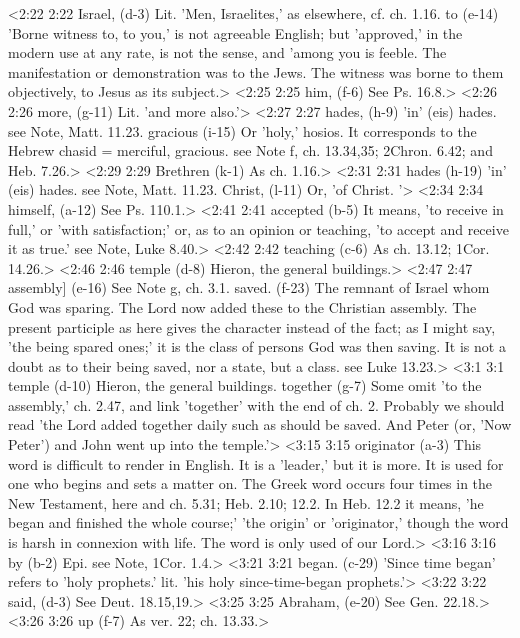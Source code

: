 <2:22 2:22  Israel, (d-3)  Lit. 'Men, Israelites,' as elsewhere, cf. ch. 1.16.
  to (e-14)  'Borne witness to, to you,' is not agreeable English; but  'approved,' in the modern use at any rate, is not the sense,  and 'among you is feeble. The manifestation or demonstration  was to the Jews. The witness was borne to them objectively, to  Jesus as its subject.>
<2:25 2:25  him, (f-6)  See Ps. 16.8.>
<2:26 2:26  more, (g-11)  Lit. 'and more also.'>
<2:27 2:27  hades, (h-9) 'in' (eis) hades. see Note, Matt. 11.23.
  gracious (i-15)  Or 'holy,' hosios. It corresponds to the Hebrew chasid =  merciful, gracious. see Note f, ch. 13.34,35; 2Chron. 6.42; and  Heb. 7.26.>
<2:29 2:29 Brethren (k-1)  As ch. 1.16.>
<2:31 2:31  hades (h-19)  'in' (eis) hades. see Note, Matt. 11.23.
  Christ, (l-11)  Or, 'of Christ. '>
<2:34 2:34  himself, (a-12)  See Ps. 110.1.>
<2:41 2:41  accepted (b-5)  It means, 'to receive in full,' or 'with satisfaction;' or,  as to an opinion or teaching, 'to accept and receive it as  true.' see Note, Luke 8.40.>
<2:42 2:42  teaching (c-6)  As ch. 13.12; 1Cor. 14.26.>
<2:46 2:46  temple (d-8)  Hieron, the general buildings.>
<2:47 2:47  assembly] (e-16)  See Note g, ch. 3.1.
  saved. (f-23)  The remnant of Israel whom God was sparing. The Lord now  added these to the Christian assembly. The present participle  as here gives the character instead of the fact; as I might  say, 'the being spared ones;' it is the class of persons God  was then saving. It is not a doubt as to their being saved, nor  a state, but a class. see Luke 13.23.>
<3:1 3:1  temple (d-10)  Hieron, the general buildings.
  together (g-7)  Some omit 'to the assembly,' ch. 2.47, and link 'together'  with the end of ch. 2. Probably we should read 'the Lord added  together daily such as should be saved. And Peter (or, 'Now  Peter') and John went up into the temple.'>
<3:15 3:15  originator (a-3)  This word is difficult to render in English. It is a  'leader,' but it is more. It is used for one who begins and  sets a matter on. The Greek word occurs four times in the New  Testament, here and ch. 5.31; Heb. 2.10; 12.2. In Heb. 12.2 it  means, 'he began and finished the whole course;' 'the origin'  or 'originator,' though the word is harsh in connexion with  life. The word is only used of our Lord.>
<3:16 3:16  by (b-2)  Epi. see Note, 1Cor. 1.4.>
<3:21 3:21  began. (c-29)  'Since time began' refers to 'holy prophets.' lit. 'his holy  since-time-began prophets.'>
<3:22 3:22  said, (d-3)  See Deut. 18.15,19.>
<3:25 3:25  Abraham, (e-20)  See Gen. 22.18.>
<3:26 3:26  up (f-7)  As ver. 22; ch. 13.33.>
